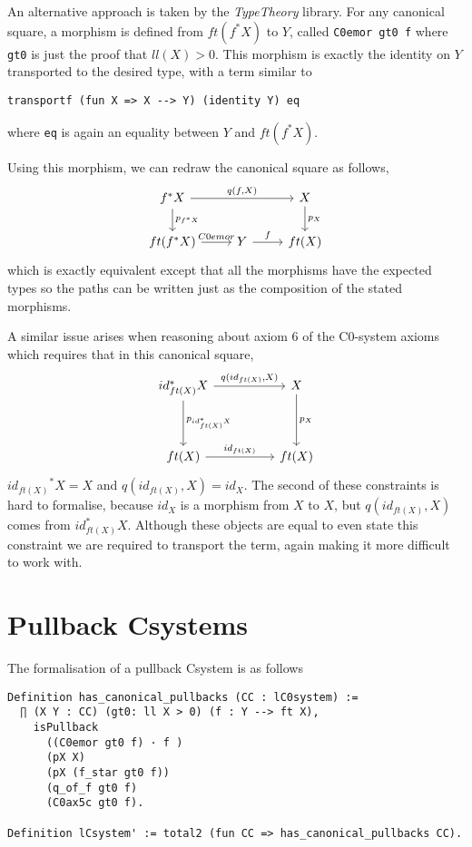 An alternative approach is taken by the \textit{TypeTheory} library. For any
canonical square, a morphism is defined from $ft(f^*X)$ to $Y$, called
\lstinline|C0emor gt0 f| where \lstinline|gt0| is just the proof that $ll(X)>0$.
This morphism is exactly the identity on $Y$ transported to the desired type,
with a term similar to
\begin{lstlisting}
transportf (fun X => X --> Y) (identity Y) eq
\end{lstlisting}
where \lstinline|eq| is again an equality between $Y$ and $ft(f^*X)$.

Using this morphism, we can redraw the canonical square as follows,
\[
\begin{tikzcd}
    f^*X\ar[rr,"{q(f,X)}"]\ar[d,"p_{f^*X}"]&&X\ar[d,"p_X"] \\
    ft(f^*X)\ar[r,"C0emor"]&Y\ar[r,"f"]&ft(X)
\end{tikzcd}
\]
which is exactly equivalent except that all the morphisms have the expected
types so the paths can be written just as the composition of the stated
morphisms.

A similar issue arises when reasoning about axiom 6 of the C0-system axioms
which requires that in this canonical square,
\[
\begin{tikzcd}[sep=huge]
    {id_{ft(X)}^*X}
    \ar[r, "{q(id_{ft(X)}, X)}"]
    \ar[d, "p_{id_{ft(X)}^*X}"]&
    X\ar[d, "p_X"] \\
    ft(X)
    \ar[r, "id_{ft(X)}"]&
    ft(X)
\end{tikzcd}
\]
${id_{ft(X)}}^*X = X$ and $q(id_{ft(X)}, X) = id_X$. The second of these
constraints is hard to formalise, because $id_X$ is a morphism from $X$ to $X$,
but $q(id_{ft(X)}, X)$ comes from $id_{ft(X)}^*X$. Although these objects are
equal to even state this constraint we are required to transport the term, again
making it more difficult to work with.

\section{Pullback Csystems}
The formalisation of a pullback Csystem is as follows
\begin{lstlisting}
Definition has_canonical_pullbacks (CC : lC0system) := 
  ∏ (X Y : CC) (gt0: ll X > 0) (f : Y --> ft X), 
    isPullback 
      ((C0emor gt0 f) · f )
      (pX X) 
      (pX (f_star gt0 f))
      (q_of_f gt0 f)
      (C0ax5c gt0 f).

Definition lCsystem' := total2 (fun CC => has_canonical_pullbacks CC).
\end{lstlisting}

